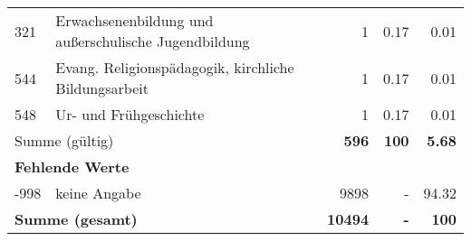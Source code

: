 \begin{longtable}{lXrrr}
        321 & \multicolumn{1}{X}{Erwachsenenbildung und außerschulische Jugendbildung} & %
          \num{1} &
          \num[round-mode=places,round-precision=2]{0,17} &
          \num[round-mode=places,round-precision=2]{0,01} \\

        544 & \multicolumn{1}{X}{Evang. Religionspädagogik, kirchliche Bildungsarbeit} & %
          \num{1} &
          \num[round-mode=places,round-precision=2]{0,17} &
          \num[round-mode=places,round-precision=2]{0,01} \\

        548 & \multicolumn{1}{X}{Ur- und Frühgeschichte} & %
          \num{1} &
          \num[round-mode=places,round-precision=2]{0,17} &
          \num[round-mode=places,round-precision=2]{0,01} \\

     \midrule
     \multicolumn{2}{l}{Summe (gültig)} &
       \textbf{\num{596}} &
     \textbf{100} &
       \textbf{\num[round-mode=places,round-precision=2]{5,68}} \\
     \multicolumn{5}{l}{\textbf{Fehlende Werte}}\\
       -998 &
       keine Angabe &
         \num{9898} &
        - &
         \num[round-mode=places,round-precision=2]{94,32} \\
     \midrule
     \multicolumn{2}{l}{\textbf{Summe (gesamt)}} &
          \textbf{\num{10494}} &
        \textbf{-} &
        \textbf{100} \\
     \bottomrule
     \end{longtable}
     
